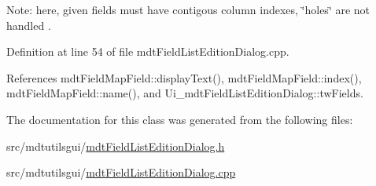 Note\-: here, given fields must have contigous column indexes, \char`\"{}holes\char`\"{} are not handled . 

Definition at line 54 of file mdt\-Field\-List\-Edition\-Dialog.\-cpp.



References mdt\-Field\-Map\-Field\-::display\-Text(), mdt\-Field\-Map\-Field\-::index(), mdt\-Field\-Map\-Field\-::name(), and Ui\-\_\-mdt\-Field\-List\-Edition\-Dialog\-::tw\-Fields.



The documentation for this class was generated from the following files\-:\begin{DoxyCompactItemize}
\item 
src/mdtutilsgui/\hyperlink{mdt_field_list_edition_dialog_8h}{mdt\-Field\-List\-Edition\-Dialog.\-h}\item 
src/mdtutilsgui/\hyperlink{mdt_field_list_edition_dialog_8cpp}{mdt\-Field\-List\-Edition\-Dialog.\-cpp}\end{DoxyCompactItemize}
